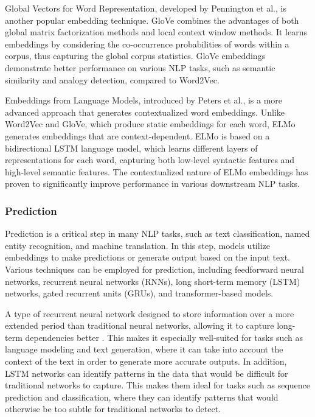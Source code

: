 
Global Vectors for Word Representation, developed by Pennington et al.\cite{pennington-etal-2014-glove}, is another popular embedding technique. GloVe combines the advantages of both global matrix factorization methods and local context window methods. It learns embeddings by considering the co-occurrence probabilities of words within a corpus, thus capturing the global corpus statistics. GloVe embeddings demonstrate better performance on various NLP tasks, such as semantic similarity and analogy detection, compared to Word2Vec.


Embeddings from Language Models, introduced by Peters et al.\cite{ELMo}, is a more advanced approach that generates contextualized word embeddings. Unlike Word2Vec and GloVe, which produce static embeddings for each word, ELMo generates embeddings that are context-dependent. ELMo is based on a bidirectional LSTM language model, which learns different layers of representations for each word, capturing both low-level syntactic features and high-level semantic features. The contextualized nature of ELMo embeddings has proven to significantly improve performance in various downstream NLP tasks.

\subsubsection{Prediction}

Prediction is a critical step in many NLP tasks, such as text classification, named entity recognition, and machine translation. In this step, models utilize embeddings to make predictions or generate output based on the input text. Various techniques can be employed for prediction, including feedforward neural networks, recurrent neural networks (RNNs), long short-term memory (LSTM) networks, gated recurrent units (GRUs), and transformer-based models.


A type of recurrent neural network designed to store information over a more extended period than traditional neural networks, allowing it to capture long-term dependencies better \cite{Hochreiter1997LongSM}.
This makes it especially well-suited for tasks such as language modeling and text generation, where it can take into account the context of the text in order to generate more accurate outputs.
In addition, LSTM networks can identify patterns in the data that would be difficult for traditional networks to capture. This makes them ideal for tasks such as sequence prediction and classification, where they can identify patterns that would otherwise be too subtle for traditional networks to detect.

